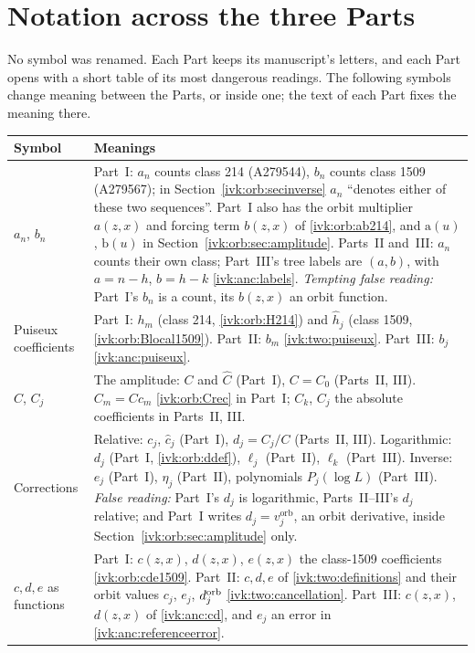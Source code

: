 \documentclass[11pt,letterpaper]{article}
\theoremstyle{remark}\newtheorem{remark}[theorem]{Remark}
\begin{document}
\section*{Notation across the three Parts}\label{ivk:sec:notation}
No symbol was renamed. Each Part keeps its manuscript's letters, and each Part opens with a short table of its most dangerous readings. The following symbols change meaning between the Parts, or inside one; the text of each Part fixes the meaning there.
\begingroup\small\setlength{\parskip}{0pt}
\begin{longtable}{@{}>{\raggedright\arraybackslash}p{} >{\raggedright\arraybackslash}p{}@{}}
\toprule
Symbol & Meanings\\
\midrule
\endhead
$a_n$, $b_n$ & Part~I: $a_n$ counts class 214 (A279544), $b_n$ counts class 1509 (A279567); in Section~\ref{ivk:orb:secinverse} $a_n$ ``denotes either of these two sequences''. Part~I also has the orbit multiplier $a(z,x)$ and forcing term $b(z,x)$ of \eqref{ivk:orb:ab214}, and $\mathrm a(u)$, $\mathrm b(u)$ in Section~\ref{ivk:orb:sec:amplitude}. Parts~II and~III: $a_n$ counts their own class; Part~III's tree labels are $(a,b)$, with $a=n-h$, $b=h-k$ \eqref{ivk:anc:labels}. \emph{Tempting false reading:} Part~I's $b_n$ is a count, its $b(z,x)$ an orbit function.\\
Puiseux coefficients & Part~I: $h_m$ (class 214, \eqref{ivk:orb:H214}) and $\widehat h_j$ (class 1509, \eqref{ivk:orb:Blocal1509}). Part~II: $b_m$ \eqref{ivk:two:puiseux}. Part~III: $b_j$ \eqref{ivk:anc:puiseux}.\\
$C$, $C_j$ & The amplitude: $C$ and $\widehat C$ (Part~I), $C=C_0$ (Parts~II, III). $C_m=Cc_m$ \eqref{ivk:orb:Crec} in Part~I; $C_k$, $C_j$ the absolute coefficients in Parts~II, III.\\
Corrections & Relative: $c_j$, $\widehat c_j$ (Part~I), $d_j=C_j/C$ (Parts~II, III). Logarithmic: $d_j$ (Part~I, \eqref{ivk:orb:ddef}), $\ell_j$ (Part~II), $\ell_k$ (Part~III). Inverse: $e_j$ (Part~I), $\eta_j$ (Part~II), polynomials $P_j(\log L)$ (Part~III). \emph{False reading:} Part~I's $d_j$ is logarithmic, Parts~II--III's $d_j$ relative; and Part~I writes $d_j=v_j^{\mathrm{orb}}$, an orbit derivative, inside Section~\ref{ivk:orb:sec:amplitude} only.\\
$c,d,e$ as functions & Part~I: $c(z,x)$, $d(z,x)$, $e(z,x)$ the class-1509 coefficients \eqref{ivk:orb:cde1509}. Part~II: $c,d,e$ of \eqref{ivk:two:definitions} and their orbit values $c_j$, $e_j$, $d_j^{\rm orb}$ \eqref{ivk:two:cancellation}. Part~III: $c(z,x)$, $d(z,x)$ of \eqref{ivk:anc:cd}, and $e_j$ an error in \eqref{ivk:anc:referenceerror}.\\

\end{longtable}
\end{document}
